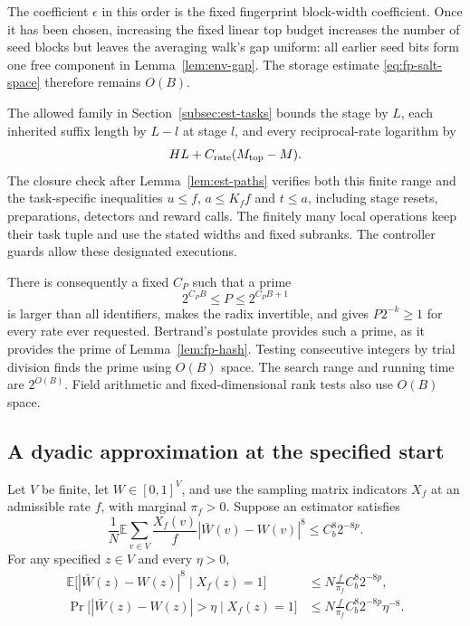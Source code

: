The coefficient $\epsilon$ in this order is the fixed fingerprint
block-width coefficient. Once it has been chosen, increasing the fixed
linear top budget increases the number of seed blocks but leaves the
averaging walk's gap uniform: all earlier seed bits form one free component in
Lemma~\ref{lem:env-gap}. The storage estimate
\eqref{eq:fp-salt-space} therefore remains $O(B)$.

The allowed family in Section~\ref{subsec:est-tasks} bounds the stage
by $L$, each inherited suffix length by $L-l$ at stage $l$, and every
reciprocal-rate logarithm by
\begin{equation}\label{eq:final-admissible}
HL+C_{\rm rate}(M_{\rm top}-M).
\end{equation}
The closure check after Lemma~\ref{lem:est-paths} verifies both this
finite range and the task-specific inequalities $u\le f$,
$a\le K_f f$ and $t\le a$, including stage resets, preparations,
detectors and reward calls.  The finitely many local operations keep
their task tuple and use the stated widths and fixed subranks.
The controller guards allow these designated executions.

There is consequently a fixed $C_P$ such that a prime
\[
2^{C_PB}\le P\le 2^{C_PB+1}
\]
is larger than all identifiers, makes the radix invertible, and gives
$P2^{-k}\ge1$ for every rate ever requested. Bertrand's postulate
provides such a prime, as it provides the prime of
Lemma~\ref{lem:fp-hash}.
Testing consecutive integers by trial division finds the prime
using $O(B)$ space. The search range and running time are
$2^{O(B)}$. Field arithmetic and fixed-dimensional rank tests also
use $O(B)$ space.

\subsection{A dyadic approximation at the specified start}

\begin{lemma}\label{lem:final-majority}
Let $V$ be finite, let $W\in[0,1]^V$, and use the sampling matrix
indicators $X_f$ at an admissible rate $f$, with marginal $\pi_f>0$.
Suppose an estimator satisfies
\[
\frac1N\mathbb E\sum_{v\in V}\frac{X_f(v)}f
 |\bar W(v)-W(v)|^8\le C_b^8 2^{-8p}.
\]
For any specified $z\in V$ and every $\eta>0$,
\begin{align}
\mathbb E\bigl[|\bar W(z)-W(z)|^8\mid X_f(z)=1\bigr]
 &\le N\frac f{\pi_f}C_b^8 2^{-8p},
 \label{eq:final-conditional}\\
\Pr\bigl[|\bar W(z)-W(z)|>\eta\mid X_f(z)=1\bigr]
 &\le N\frac f{\pi_f}C_b^8 2^{-8p}\eta^{-8}.
 \label{eq:final-tail}
\end{align}
\end{lemma}

